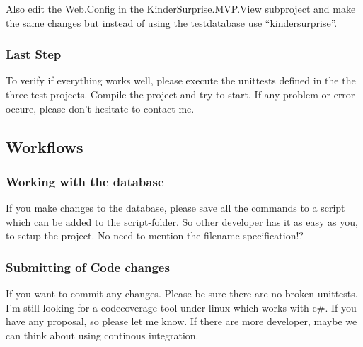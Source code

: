 \documentclass{article}
\begin{document}
Also edit the Web.Config in the KinderSurprise.MVP.View subproject and make the
same changes but instead of using the testdatabase use ``kindersurprise''.

\subsubsection{Last Step}
To verify if everything works well, please execute the unittests defined in the
the three test projects.
Compile the project and try to start.
If any problem or error occure, please don't hesitate to contact me.

\subsection{Workflows}
\subsubsection{Working with the database}
If you make changes to the database, please save all the commands to a script
which can be added to the script-folder. So other developer has it as easy as
you, to setup the project. No need to mention the filename-specification!?
\subsubsection{Submitting of Code changes}
If you want to commit any changes. Please be sure there are no broken unittests.
I'm still looking for a codecoverage tool under linux which works with c\#. If
you have any proposal, so please let me know. If there are more developer, maybe
we can think about using continous integration.
\end{document}
